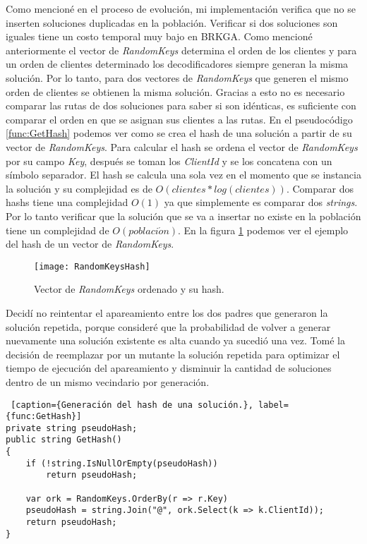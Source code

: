 \bigskip

Como mencioné en el proceso de evolución, mi implementación verifica que no se inserten soluciones duplicadas en la población. Verificar si dos soluciones son iguales tiene un costo temporal muy bajo en BRKGA. Como mencioné anteriormente el vector de \textit{RandomKeys} determina el orden de los clientes y para un orden de clientes determinado los decodificadores siempre generan la misma solución. Por lo tanto, para dos vectores de \textit{RandomKeys} que generen el mismo orden de clientes se obtienen la misma solución. Gracias a esto no es necesario comparar las rutas de dos soluciones para saber si son idénticas, es suficiente con comparar el orden en que se asignan sus clientes a las rutas. En el pseudocódigo \ref{func:GetHash} podemos ver como se crea el hash de una solución a partir de su vector de \textit{RandomKeys}. Para calcular el hash se ordena el vector de \textit{RandomKeys} por su campo \textit{Key}, después se toman los \textit{ClientId} y se los concatena con un símbolo separador. El hash se calcula una sola vez en el momento que se instancia la solución y su complejidad es de $O(clientes * log(clientes))$. Comparar dos hashs tiene una complejidad $O(1)$ ya que simplemente es comparar dos \textit{strings}. Por lo tanto verificar que la solución que se va a insertar no existe en la población tiene un complejidad de $O(poblaci\acute{o}n)$. En la figura \ref{fig:RandomKeysHash} podemos ver el ejemplo del hash de un vector de \textit{RandomKeys}.

\bigskip

\begin{figure}[h]
	\caption{Vector de \textit{RandomKeys} ordenado y su hash.}
	\centering
	\texttt{[image: RandomKeysHash]}
	\label{fig:RandomKeysHash}
\end{figure}

\bigskip

Decidí no reintentar el apareamiento entre los dos padres que generaron la solución repetida, porque consideré que la probabilidad de volver a generar nuevamente una solución existente es alta cuando ya sucedió una vez. Tomé la decisión de reemplazar por un mutante la solución repetida para optimizar el tiempo de ejecución del apareamiento y disminuir la cantidad de soluciones dentro de un mismo vecindario por generación.

\bigskip

\begin{minipage}{\textwidth}
\begin{lstlisting} [caption={Generación del hash de una solución.}, label={func:GetHash}]
private string pseudoHash;
public string GetHash()
{
	if (!string.IsNullOrEmpty(pseudoHash))
		return pseudoHash;
		
	var ork = RandomKeys.OrderBy(r => r.Key)
	pseudoHash = string.Join("@", ork.Select(k => k.ClientId));
	return pseudoHash;
}
\end{lstlisting}
\end{minipage}

